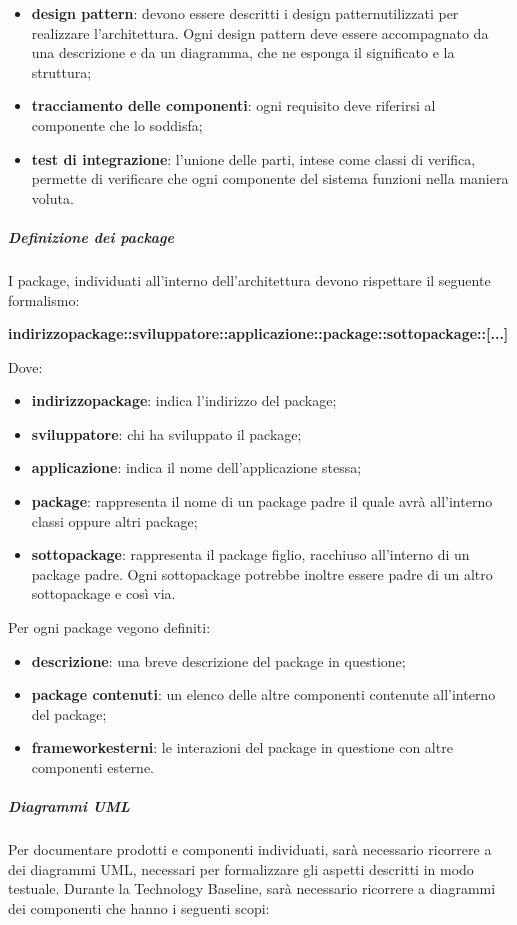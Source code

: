 \begin{itemize}
\begin{itemize}
				\item \textbf{design pattern}: devono essere descritti i design pattern\glosp utilizzati per realizzare l'architettura. Ogni design pattern deve essere accompagnato da una descrizione e da un diagramma, che ne esponga il significato e la struttura;
				\item \textbf{tracciamento delle componenti}: ogni requisito deve riferirsi al componente che lo soddisfa;
				\item \textbf{test di integrazione}: l'unione delle parti, intese come classi di verifica, permette di verificare che ogni componente del sistema funzioni nella maniera voluta.
			\end{itemize}
			\subparagraph{Definizione dei package}
			I package\glo, individuati all'interno dell'architettura devono rispettare il seguente formalismo:\newline \newline			\centerline{\textbf{indirizzo\textunderscore package::sviluppatore::applicazione::package::sottopackage::[...]}}\newline
			Dove:
			\begin{itemize}
			\item \textbf{indirizzo\textunderscore package}: indica l'indirizzo del package;
			\item \textbf{sviluppatore}: chi ha sviluppato il package;
			\item \textbf{applicazione}: indica il nome dell'applicazione stessa;
			\item \textbf{package}: rappresenta il nome di un package padre il quale avrà all'interno classi oppure altri package;
			\item \textbf{sottopackage}: rappresenta il package figlio, racchiuso all'interno di un package padre. Ogni sottopackage potrebbe inoltre essere padre di un altro sottopackage e così via.
			\end{itemize}
			Per ogni package vegono definiti:
			\begin{itemize}
			\item \textbf{descrizione}: una breve descrizione del package in questione;
			\item \textbf{package contenuti}: un elenco delle altre componenti contenute all'interno del package;
			\item \textbf{framework\glosp esterni}: le interazioni del package in questione con altre componenti esterne.
			\end{itemize}
			\subparagraph{Diagrammi UML}
			Per documentare prodotti e componenti individuati, sarà necessario ricorrere a dei diagrammi UML\glo, necessari per formalizzare gli aspetti descritti in modo testuale. Durante la Technology Baseline, sarà necessario ricorrere a diagrammi dei componenti che hanno i seguenti scopi:

\end{itemize}
